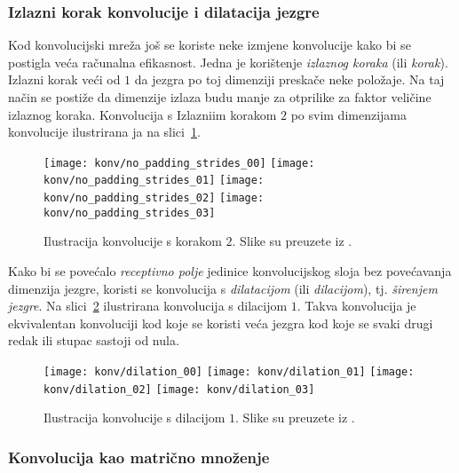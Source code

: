 \documentclass[utf8, diplomski, lmodern]{fer}
\begin{document}
\subsubsection{Izlazni korak konvolucije i dilatacija jezgre}

Kod konvolucijski mreža još se koriste neke izmjene konvolucije kako bi se postigla veća računalna efikasnost. Jedna je korištenje \emph{izlaznog koraka} (ili \emph{korak}). Izlazni korak veći od $1$ da jezgra po toj dimenziji preskače neke položaje. Na taj način se postiže da dimenzije izlaza budu manje za otprilike za faktor veličine izlaznog koraka. Konvolucija s Izlazniim korakom $2$ po svim dimenzijama konvolucije ilustrirana ja na slici~\ref{fig:konvolucija-izl-korak}. 

\begin{figure}
	\centering
	\texttt{[image: konv/no\_padding\_strides\_00]}
	\texttt{[image: konv/no\_padding\_strides\_01]}
	\texttt{[image: konv/no\_padding\_strides\_02]}
	\texttt{[image: konv/no\_padding\_strides\_03]}
	\caption{Ilustracija konvolucije s korakom $2$. Slike su preuzete iz \citet{Dumoulin:2016:GCADL}.}
	\label{fig:konvolucija-izl-korak}
\end{figure}

Kako bi se povećalo \emph{receptivno polje} jedinice konvolucijskog sloja bez povećavanja dimenzija jezgre, koristi se konvolucija s \emph{dilatacijom} (ili \emph{dilacijom}), tj. \emph{širenjem jezgre}. Na slici~\ref{fig:konvolucija-dilatacija} ilustrirana konvolucija s dilacijom $1$. Takva konvolucija je ekvivalentan konvoluciji kod koje se koristi veća jezgra kod koje se svaki drugi redak ili stupac sastoji od nula.

\begin{figure}
	\centering
	\texttt{[image: konv/dilation\_00]}
	\texttt{[image: konv/dilation\_01]}
	\texttt{[image: konv/dilation\_02]}
	\texttt{[image: konv/dilation\_03]}
	\caption{Ilustracija konvolucije s dilacijom $1$. Slike su preuzete iz \citet{Dumoulin:2016:GCADL}.}
	\label{fig:konvolucija-dilatacija}
\end{figure}

\subsubsection{Konvolucija kao matrično množenje}
\end{document}
